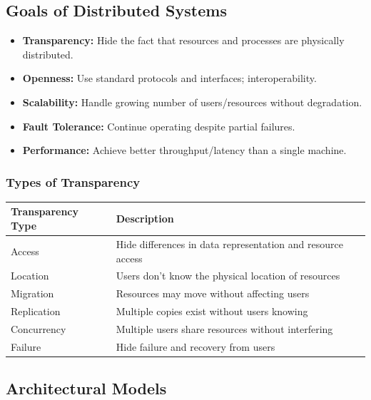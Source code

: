 \documentclass[11pt,a4paper]{article}
\begin{document}
\subsection{Goals of Distributed Systems}
\begin{itemize}[leftmargin=*, itemsep=3pt]
  \item \textbf{Transparency:} Hide the fact that resources and processes are physically distributed.
  \item \textbf{Openness:} Use standard protocols and interfaces; interoperability.
  \item \textbf{Scalability:} Handle growing number of users/resources without degradation.
  \item \textbf{Fault Tolerance:} Continue operating despite partial failures.
  \item \textbf{Performance:} Achieve better throughput/latency than a single machine.
\end{itemize}

\subsubsection{Types of Transparency}
\begin{longtable}{@{}p{3.8cm}p{9.5cm}@{}}
\toprule
\rowcolor{primary!15}
\textbf{Transparency Type} & \textbf{Description} \\
\midrule
\endhead
Access & Hide differences in data representation and resource access \\
Location & Users don't know the physical location of resources \\
Migration & Resources may move without affecting users \\
Replication & Multiple copies exist without users knowing \\
Concurrency & Multiple users share resources without interfering \\
Failure & Hide failure and recovery from users \\
\bottomrule
\end{longtable}

\subsection{Architectural Models}
\end{document}
